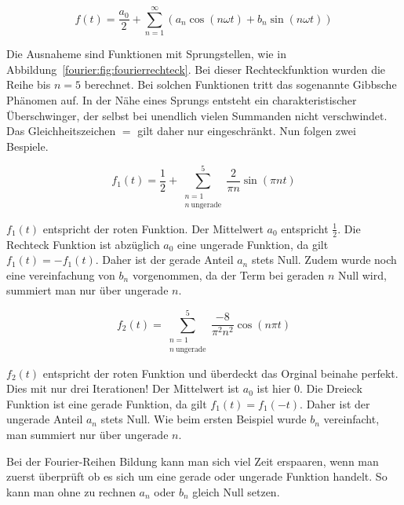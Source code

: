 \begin{equation}
f(t) = \frac{a_0}{2} + \sum_{n=1}^{\infty} \left( a_n \cos\left( n\omega t \right) + b_n \sin\left( n \omega t \right) \right)
\end{equation}


Die Ausnaheme sind Funktionen mit Sprungstellen, wie in Abbildung~\ref{fourier:fig:fourierrechteck}.
Bei dieser Rechteckfunktion wurden die Reihe bis $n = 5$ berechnet. 
Bei solchen Funktionen tritt das sogenannte Gibbsche Phänomen auf.
In der Nähe eines Sprungs entsteht ein charakteristischer Überschwinger, der selbst bei unendlich vielen Summanden nicht verschwindet.
Das Gleichheitszeichen $=$ gilt daher nur eingeschränkt. 
Nun folgen zwei Bespiele.



\begin{equation}
	f_1(t) = \frac{1}{2} + \sum_{\substack{n=1 \\ n\ \text{ungerade}}}^{5} \frac{2}{\pi n} \sin\left( \pi n t \right)
\end{equation}

$f_1(t)$ entspricht der roten Funktion. 
Der Mittelwert $a_0$ entspricht $\frac{1}{2}$. 
Die Rechteck Funktion ist abzüglich $a_0$ eine ungerade Funktion, da gilt $f_1(t) = -f_1(t)$. 
Daher ist der gerade Anteil $a_n$ stets Null. 
Zudem wurde noch eine vereinfachung von $b_n$ vorgenommen, da der Term bei geraden $n$ Null wird, summiert man nur über ungerade $n$. 





\begin{equation}
	f_2(t) = \sum_{\substack{n=1 \\ n\ \text{ungerade}}}^{5} \frac{-8}{\pi^2 n^2} \cos(n\pi t)
\end{equation}

$f_2(t)$ entspricht der roten Funktion und überdeckt das Orginal beinahe perfekt. 
Dies mit nur drei Iterationen!
Der Mittelwert ist $a_0$ ist hier 0. 
Die Dreieck Funktion ist eine gerade Funktion, da gilt $f_1(t) = f_1(-t)$. 
Daher ist der ungerade Anteil $a_n$ stets Null. 
Wie beim ersten Beispiel wurde $b_n$ vereinfacht, man summiert nur über ungerade $n$. 


Bei der Fourier-Reihen Bildung kann man sich viel Zeit erspaaren, wenn man zuerst überprüft ob es sich um eine gerade oder ungerade Funktion handelt.
So kann man ohne zu rechnen $a_n$ oder $b_n$ gleich Null setzen.




